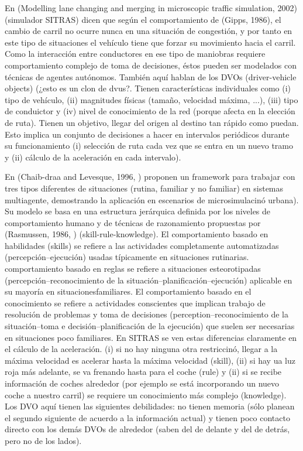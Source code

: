 En (Modelling lane changing and merging in microscopic traffic simulation, 2002) (simulador SITRAS) dicen que según el comportamiento de (Gipps, 1986), el cambio de carril no ocurre nunca en una situación de congestión, y por tanto en este tipo de situaciones el vehículo tiene que forzar su movimiento hacia el carril. Como la interacción entre conductores en ese tipo de maniobras requiere comportamiento complejo de toma de decisiones, éstos pueden ser modelados con técnicas de agentes autónomos. También aquí hablan de los DVOs (driver-vehicle objects) (¿esto es un clon de \glspl{dvu}?. Tienen características individuales como (i) tipo de vehículo, (ii) magnitudes físicas (tamaño, velocidad máxima, ...), (iii) tipo de conduictor y (iv) nivel de conocimiento de la red (porque afecta en la elección de ruta). Tienen un objetivo, llegar del origen al destino tan rápido como puedan. Esto implica un conjunto de decisiones a hacer en intervalos periódicos durante su funcionamiento (i) selección de ruta cada vez que se entra en un nuevo tramo y (ii) cálculo de la aceleración en cada intervalo).

En (Chaib-draa and Levesque, 1996, ) proponen un framework para trabajar con tres tipos diferentes de situaciones (rutina, familiar y no familiar) en sistemas multiagente, demostrando la aplicación en escenarios de microsimulacinó urbana). Su modelo se basa en una estructura jerárquica definida por los niveles de comportamiento humano y de técnicas de razonamiento propuestas por (Rasmussen, 1986, ) (skill-rule-knowledge). El comportamiento basado en habilidades (skills) se refiere a las actividades completamente automatizadas (percepción--ejecución) usadas típicamente en situaciones rutinarias. comportamiento basado en reglas se refiere a situaciones esteorotipadas (percepción--reconocimiento de la situación--planificación--ejecución) aplicable en su mayoría en situacionesfamiliares. El comportamiento basado en el conocimiento se refiere a actividades conscientes que implican trabajo de resolución de problemas y toma de decisiones (perception--reconocimiento de la situación--toma e decisión--planificación de la ejecución) que suelen ser necesarias en situaciones poco familiares. En SITRAS se ven estas diferencias claramente en el cálculo de la aceleración. (i) si no hay ninguna otra restriccinó, llegar a la máxima velocidad es acelerar hasta la máxima velocidad (skill), (ii) si hay ua luz roja más adelante, se va frenando hasta para el coche (rule) y (ii) si se recibe información de coches alrededor (por ejemplo se está incorporando un nuevo coche a nuestro carril) se requiere un conocimiento más complejo (knowledge). Los DVO aquí tienen las siguientes debilidades: no tienen memoria (sólo planean el segundo siguiente de acuerdo a la información actual) y tienen poco contacto directo con los demás DVOs de alrededor (saben del de delante y del de detrás, pero no de los lados).


